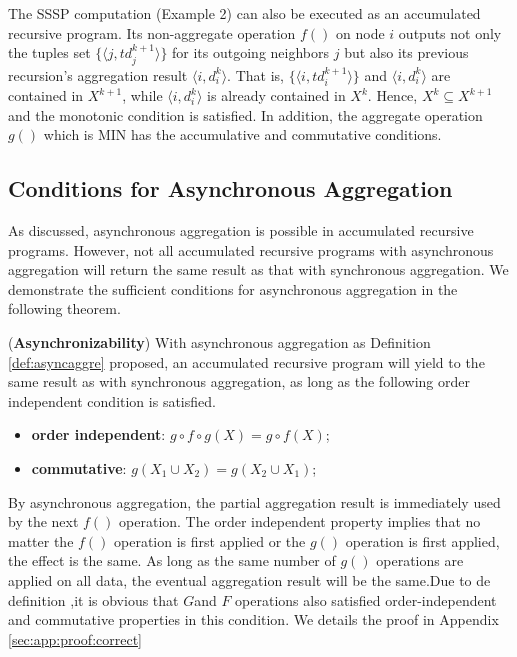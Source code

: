 The SSSP computation (Example 2) can also be executed as an accumulated recursive program. Its non-aggregate operation $f()$ on node $i$ outputs not only the tuples set $\{\langle j,td_j^{k+1}\rangle\}$ for its outgoing neighbors $j$ but also its previous recursion's aggregation result $\langle i,d_i^k\rangle$. That is, $\{\langle i,td_i^{k+1}\rangle\}$ and $\langle i,d_i^k\rangle$ are contained in $X^{k+1}$, while $\langle i,d_i^k\rangle$ is already contained in $X^{k}$. Hence, $X^{k}\subseteq X^{k+1}$ and the monotonic condition is satisfied. In addition, the aggregate operation $g()$ which is MIN has the accumulative and commutative conditions.


\subsection{Conditions for Asynchronous Aggregation}
\label{sec:async:condition}

As discussed, asynchronous aggregation is possible in accumulated recursive programs. However, not all accumulated recursive programs with asynchronous aggregation will return the same result as that with synchronous aggregation. We demonstrate the sufficient conditions for asynchronous aggregation in the following theorem.

\begin{theorem}
	\label{th:async}
	(\textbf{Asynchronizability}) With asynchronous aggregation as Definition \ref{def:asyncaggre} proposed, an accumulated recursive program will yield to the same result as with synchronous aggregation, as long as the following order independent condition is satisfied.
	\begin{itemize}
		\item \textbf{order independent}: $g\circ f\circ g(X)=g\circ f(X)$;
		\item \textbf{commutative}: $g(X_1\cup X_2)=g(X_2\cup X_1)$;
	\end{itemize}
\end{theorem}

By asynchronous aggregation, the partial aggregation result is immediately used by the next $f()$ operation. The order independent property implies that no matter the $f()$ operation is first applied or the $g()$ operation is first applied, the effect is the same. As long as the same number of $g()$ operations are applied on all data, the eventual aggregation result will be the same.Due to de definition ,it is obvious that $G$and $F$ operations also satisfied order-independent and commutative properties in this condition. We details the proof in Appendix \ref{sec:app:proof:correct}


